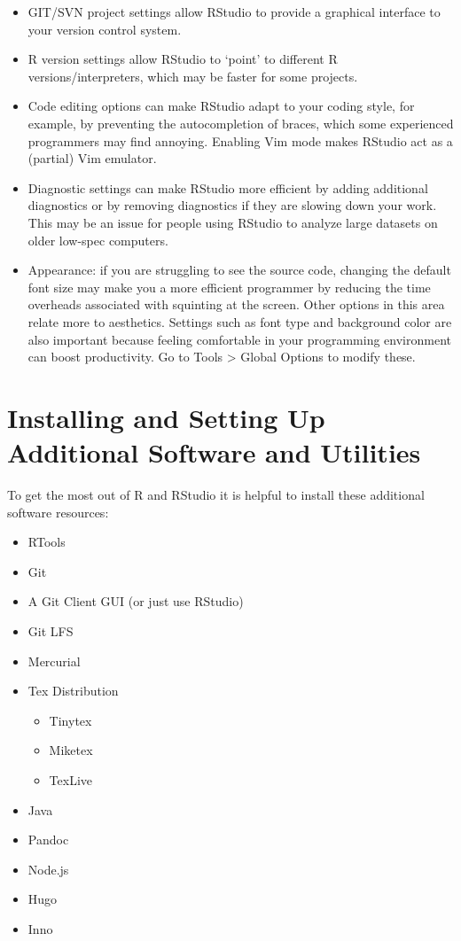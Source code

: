 \documentclass[
]{book}
\providecommand{\tightlist}{%
  \setlength{\itemsep}{0pt}\setlength{\parskip}{0pt}}
\begin{document}
\begin{itemize}
\item
  GIT/SVN project settings allow RStudio to provide a graphical
  interface to your version control system.
\item
  R version settings allow RStudio to `point' to different R
  versions/interpreters, which may be faster for some projects.
\item
  Code editing options can make RStudio adapt to your coding style, for example,
  by preventing the autocompletion of braces, which some experienced programmers
  may find annoying. Enabling Vim mode makes RStudio act as a (partial) Vim emulator.
\item
  Diagnostic settings can make RStudio more efficient by adding additional
  diagnostics or by removing diagnostics if they are slowing down your work.
  This may be an issue for people using RStudio to analyze large datasets on older
  low-spec computers.
\item
  Appearance: if you are struggling to see the source code, changing the default
  font size may make you a more efficient programmer by reducing the time overheads
  associated with squinting at the screen. Other options in this area relate more
  to aesthetics. Settings such as font type and background color are also important
  because feeling comfortable in your programming environment can boost productivity.
  Go to Tools \textgreater{} Global Options to modify these.
\end{itemize}

\hypertarget{installing-and-setting-up-additional-software-and-utilities}{%
\section{Installing and Setting Up Additional Software and Utilities}\label{installing-and-setting-up-additional-software-and-utilities}}

To get the most out of R and RStudio it is helpful to install these additional
software resources:

\begin{itemize}
\item
  RTools
\item
  Git
\item
  A Git Client GUI (or just use RStudio)
\item
  Git LFS
\item
  Mercurial
\item
  Tex Distribution

  \begin{itemize}
  \tightlist
  \item
    Tinytex
  \item
    Miketex
  \item
    TexLive
  \end{itemize}
\item
  Java
\item
  Pandoc
\item
  Node.js
\item
  Hugo
\item
  Inno
\end{itemize}
\end{document}

